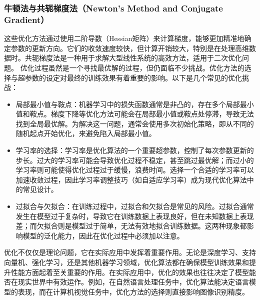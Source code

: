  \subsubsection*{牛顿法与共轭梯度法（Newton's Method and Conjugate Gradient）} 这些优化方法通过使用二阶导数（Hessian矩阵）来计算梯度，能够更加精准地确定参数的更新方向。它们的收敛速度较快，但计算开销较大，特别是在处理高维数据时。共轭梯度法是一种用于求解大型线性系统的高效方法，适用于二次优化问题。
优化过程虽然是一个寻找最优解的过程，但仍面临不少挑战。优化方法的选择与超参数的设定对最终的训练效果有着重要的影响。以下是几个常见的优化挑战：
 \begin{itemize}
\item 局部最小值与鞍点：机器学习中的损失函数通常是非凸的，存在多个局部最小值和鞍点。梯度下降等优化方法可能会在局部最小值或鞍点处停滞，导致无法找到全局最优解。为解决这一问题，通常会使用多次初始化策略，即从不同的随机起点开始优化，来避免陷入局部最小值。
\item 学习率的选择：学习率是优化算法的一个重要超参数，控制了每次参数更新的步长。过大的学习率可能会导致优化过程不稳定，甚至跳过最优解；而过小的学习率则可能使得优化过程过于缓慢，浪费时间。选择一个合适的学习率可以加速收敛过程，因此学习率调整技巧（如自适应学习率）成为现代优化算法中的常见设计。
\item  过拟合与欠拟合：在训练过程中，过拟合和欠拟合是常见的风险。过拟合通常发生在模型过于复杂时，导致它在训练数据上表现良好，但在未知数据上表现差；而欠拟合则是模型过于简单，无法有效地拟合训练数据。这两种现象都影响模型的泛化能力，因此在优化过程中必须加以注意。
  \end{itemize}
优化不仅仅是理论问题，它在实际应用中发挥着重要作用。无论是深度学习、支持向量机、强化学习，还是其他机器学习领域，优化算法都在确保模型训练效果和提升性能方面起着至关重要的作用。在实际应用中，优化的效果也往往决定了模型能否在现实世界中有效运作。例如，在自然语言处理任务中，优化算法能决定语言模型的表现，而在计算机视觉任务中，优化方法的选择则直接影响图像识别精度。

